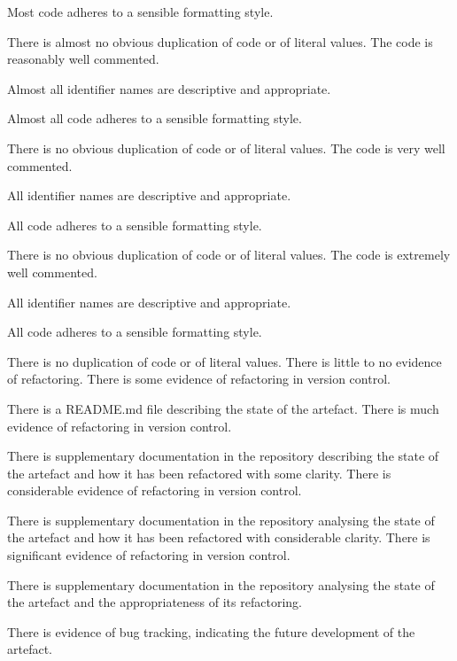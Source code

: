 \begin{markingrubric}
            \par Most code adheres to a sensible formatting style.
             \par There is almost no obvious duplication of code or of literal values.   
        \grade The code is reasonably well commented.
            \par Almost all identifier names are descriptive and appropriate.
            \par Almost all code adheres to a sensible formatting style.
             \par There is no obvious duplication of code or of literal values.
        \grade The code is very well commented.
            \par All identifier names are descriptive and appropriate.
            \par All code adheres to a sensible formatting style.
             \par There is no obvious duplication of code or of literal values.
        \grade The code is extremely well commented.
            \par All identifier names are descriptive and appropriate.
            \par All code adheres to a sensible formatting style.
            \par There is no duplication of code or of literal values.
%
        \grade \fail There is little to no evidence of refactoring. 
        \grade There is some evidence of refactoring in version control. 
            \par There is a README.md file describing the state of the artefact.  
        \grade There is much evidence of refactoring in version control.
            \par There is supplementary documentation in the repository describing the state of the artefact and how it has been refactored with some clarity.  
        \grade There is considerable evidence of refactoring in version control.  
            \par There is supplementary documentation in the repository analysing the state of the artefact and how it has been refactored with considerable clarity.  
        \grade There is significant evidence of refactoring in version control.  
            \par There is supplementary documentation in the repository analysing the state of the artefact and the appropriateness of its refactoring.  
            \par There is evidence of bug tracking, indicating the future development of the artefact.  

\end{markingrubric}
